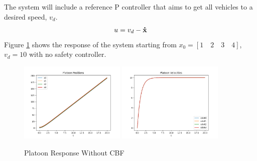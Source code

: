 The system will include a reference P controller that aims to get all vehicles to a desired speed, $v_d$.
\begin{align} \label{eqn:platoon_reference}
    u = v_d - {\mathbf{\dot{x}}}
\end{align}
\noindent Figure \ref{fig:platoon_no_cbf} shows the response of the system starting from $x_0 = [1 \quad 2 \quad 3 \quad 4]$, $v_d = 10$ with no safety controller.

\begin{figure}[H]
    \centering
    \includegraphics[width=0.45\textwidth]{Figures/Examples/Platoon/NoPositions.png}
    \includegraphics[width=0.45\textwidth]{Figures/Examples/Platoon/NoVelocities.png}
    \caption{Platoon Response Without CBF}
    \label{fig:platoon_no_cbf}
\end{figure}

